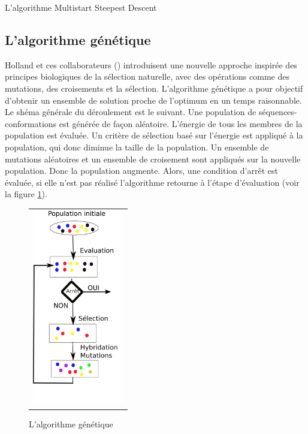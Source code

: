 \begin{algorithm}
  \label{alg:MSD}
  \caption{L'algorithme Multistart Steepest Descent}
\end{algorithm}


\subsection{L'algorithme  génétique}


Holland et ces collaborateurs (\cite{Goldberg88}) introduisent une nouvelle approche inspirée des principes biologiques de la sélection naturelle, avec des opérations comme des mutations, des croisements et la sélection. L'algorithme génétique a pour objectif d'obtenir un ensemble de solution proche de l'optimum en un temps raisonnable.
Le shéma générale du déroulement est le suivant. Une population de séquences-conformations est générée de façon aléatoire. L'énergie de tous les membres de la population est évaluée. Un critère de sélection basé sur l'énergie est appliqué à la population, qui donc diminue la taille de la population. Un ensemble de mutations aléatoires et un ensemble de croisement sont appliqués sur la nouvelle population. Donc la population augmente. Alors, une condition d'arrêt est évaluée, si elle n'est pas réalisé l'algorithme retourne à l'étape d'évaluation (voir la figure \ref{fig:algo_gene}). 



\begin{figure}[!htbp]
  \centering
  \begin{tabular}{c}
    \includegraphics[width=4cm]{figure/algo_genetique.png} \\
  \end{tabular}
  \caption{L'algorithme génétique}
  \label{fig:algo_gene}
\end{figure}


